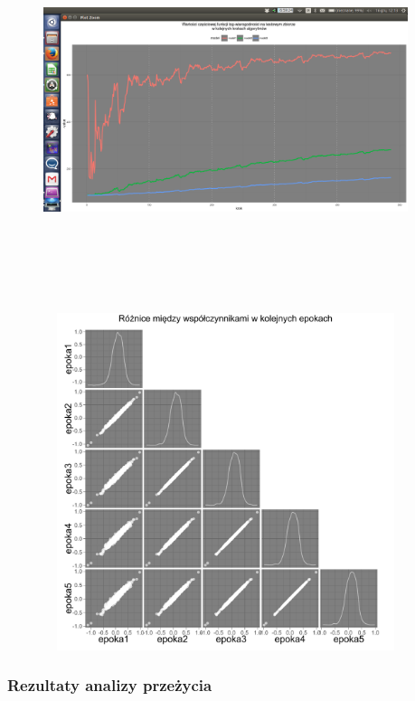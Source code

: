 \begin{figure}[!ht]
\centering
\includegraphics[width=0.95\textwidth, height = 280pt]{Obrazki/analiza/wartosci_loglik_test_ver_minus.png}
\caption{\label{wykres5}}
\ \\
\includegraphics[width=0.95\textwidth, height = 280pt]{Obrazki/analiza/ggpairs_2.pdf}
\caption{\label{wykres6}}
\end{figure}

\subsubsection{Rezultaty analizy przeżycia}


